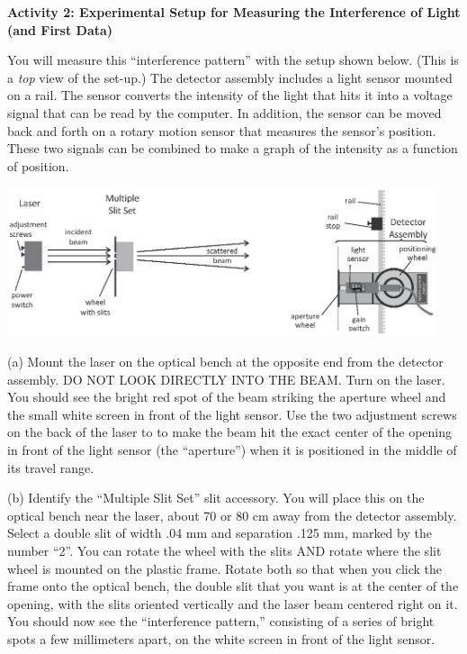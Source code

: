 \textbf{Activity 2: Experimental Setup for Measuring the Interference of Light (and First Data)}

You will measure this ``interference pattern'' with the setup shown below. 
(This is a \textit{top} view of the set-up.) 
The detector assembly includes a light sensor mounted on a rail. The sensor converts the intensity 
of the light that hits it into a voltage signal that can be read by the
computer. In addition, the sensor can be moved back and
forth on a rotary motion sensor that measures the sensor's position. These two signals can be combined to
make a graph of the intensity as a function of position.

{\centering \includegraphics[width=0.95\textwidth]{interference_of_light/apparatus.eps} \par}
\label{figure_rail_stop}

(a) Mount the laser on the 
optical bench at the opposite end from the detector assembly.
DO NOT LOOK DIRECTLY INTO
THE BEAM.  Turn on the
laser.  You should see the bright red spot of the beam striking
the aperture wheel and the small white screen in front of the light sensor. 
Use the two adjustment screws on the back of the laser to to make the beam hit the exact center of the opening in front of the light sensor (the ``aperture'') when it is positioned in the middle of its travel range.  


(b) Identify the ``Multiple Slit Set'' slit accessory.  You will place this on the optical bench near the laser, about 70 or 80 cm away from the detector assembly.  Select a double slit of width .04 mm and separation .125 mm, marked by the number ``2''. You can rotate the wheel with the slits AND rotate where the slit wheel is mounted on the plastic frame.  
Rotate both so that when you click the frame onto the optical bench, the double slit that you want is at the center of the opening, with the slits oriented vertically and the laser beam centered right on it.  You should now see the ``interference pattern,'' consisting of a series of bright spots a few millimeters apart, on the white screen in front of the light sensor.

